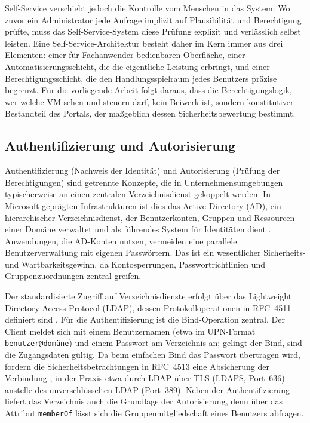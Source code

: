 \documentclass[12pt,a4paper]{article}
\begin{document}
Self-Service verschiebt jedoch die Kontrolle vom Menschen in das System: Wo zuvor ein Administrator jede Anfrage implizit auf Plausibilität und Berechtigung prüfte, muss das Self-Service-System diese Prüfung explizit und verlässlich selbst leisten. Eine Self-Service-Architektur besteht daher im Kern immer aus drei Elementen: einer für Fachanwender bedienbaren Oberfläche, einer Automatisierungsschicht, die die eigentliche Leistung erbringt, und einer Berechtigungsschicht, die den Handlungsspielraum jedes Benutzers präzise begrenzt. Für die vorliegende Arbeit folgt daraus, dass die Berechtigungslogik, wer welche VM sehen und steuern darf, kein Beiwerk ist, sondern konstitutiver Bestandteil des Portals, der maßgeblich dessen Sicherheitsbewertung bestimmt.

\subsection{Authentifizierung und Autorisierung}

Authentifizierung (Nachweis der Identität) und Autorisierung (Prüfung der Berechtigungen) sind getrennte Konzepte, die in Unternehmensumgebungen typischerweise an einen zentralen Verzeichnisdienst gekoppelt werden. In Microsoft-geprägten Infrastrukturen ist dies das Active Directory (AD), ein hierarchischer Verzeichnisdienst, der Benutzerkonten, Gruppen und Ressourcen einer Domäne verwaltet und als führendes System für Identitäten dient \parencite{microsoft-ad-overview}. Anwendungen, die AD-Konten nutzen, vermeiden eine parallele Benutzerverwaltung mit eigenen Passwörtern. Das ist ein wesentlicher Sicherheits- und Wartbarkeitsgewinn, da Kontosperrungen, Passwortrichtlinien und Gruppenzuordnungen zentral greifen.

Der standardisierte Zugriff auf Verzeichnisdienste erfolgt über das Lightweight Directory Access Protocol (LDAP), dessen Protokolloperationen in RFC~4511 definiert sind \parencite{rfc4511}. Für die Authentifizierung ist die Bind-Operation zentral. Der Client meldet sich mit einem Benutzernamen (etwa im UPN-Format \texttt{benutzer@domäne}) und einem Passwort am Verzeichnis an; gelingt der Bind, sind die Zugangsdaten gültig. Da beim einfachen Bind das Passwort übertragen wird, fordern die Sicherheitsbetrachtungen in RFC~4513 eine Absicherung der Verbindung \parencite{rfc4513}, in der Praxis etwa durch LDAP über TLS (LDAPS, Port~636) anstelle des unverschlüsselten LDAP (Port~389). Neben der Authentifizierung liefert das Verzeichnis auch die Grundlage der Autorisierung, denn über das Attribut \texttt{memberOf} lässt sich die Gruppenmitgliedschaft eines Benutzers abfragen.
\end{document}
